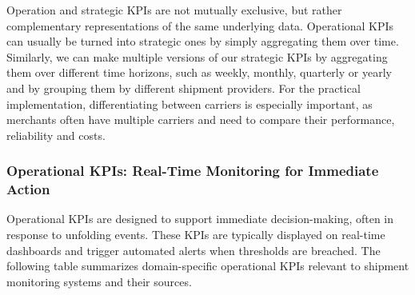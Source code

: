 \documentclass{imc-inf}
\begin{document}
Operation and strategic KPIs are not mutually exclusive, but rather complementary representations of the same underlying data.
Operational KPIs can usually be turned into strategic ones by simply aggregating them over time.
Similarly, we can make multiple versions of our strategic KPIs by aggregating them over different time horizons, such as weekly, monthly, quarterly or yearly and by grouping them by different shipment providers.
For the practical implementation, differentiating between carriers is especially important, as merchants often have multiple carriers and need to compare their performance, reliability and costs.

\subsubsection{Operational KPIs: Real-Time Monitoring for Immediate Action}
Operational KPIs are designed to support immediate decision-making, often in response to unfolding events.
These KPIs are typically displayed on real-time dashboards and trigger automated alerts when thresholds are breached.
The following table summarizes domain-specific operational KPIs relevant to shipment monitoring systems and their sources.
\end{document}
